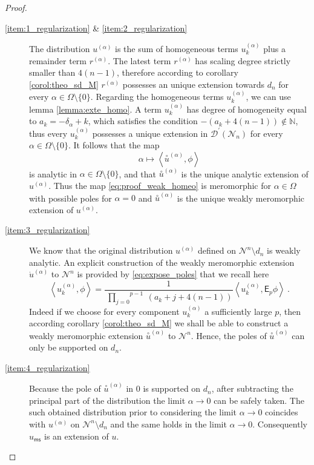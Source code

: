 \documentclass[11pt]{book}
\newcommand{\ms}{\mathsf{ms}}
\newcommand{\sm}[1]{\left\langle#1\right\rangle}
\newcommand{\exte}[1]{\overset{\circ}{#1}}
\newcommand{\Dcal}{\mathcal{D}}
\newcommand{\Ncal}{\mathcal{N}}
\newcommand{\Nbb}{\mathbb{N}}
\newcommand{\Esf}{\mathsf{E}}
\theoremstyle{break}
\begin{document}
\begin{proof}
\begin{description}
%
%
\item[\ref{item:1_regularization} \& \ref{item:2_regularization}] The distribution $u^{(\alpha)}$ is the sum of homogeneous terms $u^{(\alpha)}_k$ plus a remainder term $r^{(\alpha)}$. The latest term $r^{(\alpha)}$ has scaling degree strictly smaller than $4(n-1)$, therefore according to corollary \ref{corol:theo_sd_M} $r^{(\alpha)}$ possesses an unique extension towards $d_n$ for every $\alpha \in \Omega \setminus \{0\}$. Regarding the homogeneous terms $u^{(\alpha)}_k$, we can use lemma \ref{lemma:exte_homo}. A term $u^{(\alpha)}_k$ has degree of homogeneity equal to $a_k = -\delta_\alpha + k$, which satisfies the condition $-\left(a_k+4(n-1)\right) \notin \Nbb$, thus every $u^{(\alpha)}_k$ possesses a unique extension in $\Dcal^\prime(\Ncal_n)$ for every $\alpha \in \Omega \setminus \{0\}$. It follows that the map
%
\begin{equation}
\alpha \mapsto \sm{\exte{u}^{(\alpha)} , \phi} 
\label{eq:proof_weak_homeo}
\end{equation}
%
is analytic in $\alpha \in \Omega \setminus \{0\}$, and that $\exte{u}^{(\alpha)}$ is the unique analytic extension of $u^{(\alpha)}$. Thus the map \eqref{eq:proof_weak_homeo} is meromorphic for $\alpha \in \Omega$ with possible poles for $\alpha=0$ and $\exte{u}^{(\alpha)}$ is the unique weakly meromorphic extension of $u^{(\alpha)}$.%
%
%
\item[\ref{item:3_regularization}] We know that the original distribution $u^{(\alpha)}$ defined on $\Ncal^n\setminus d_n$ is weakly analytic. An explicit construction of the weakly meromorphic extension $\dot{u}^{(\alpha)}$ to $\Ncal^n$ is provided by 
\eqref{eq:expose_poles} that we recall here%
%
\begin{equation*}%
\sm{ u^{(\alpha)}_k, \phi } = \frac{1}{\overset{p-1}{\ \underset{j=0}{\prod}} \ (a_k+j+4(n-1))}   \sm{ u^{(\alpha)}_k, \Esf_p \phi } \ .%
\end{equation*}%
%
Indeed if we choose for every component $u^{(\alpha)}_k$ a sufficiently large $p$, then according corollary \ref{corol:theo_sd_M} we shall be able to construct a weakly meromorphic extension $\exte{u}^{(\alpha)}$ to $\Ncal^n$. Hence, the poles of $\exte{u}^{(\alpha)}$ can only be supported on $d_n$.%
%
%
\item[\ref{item:4_regularization}] Because the pole of $\exte{u}^{(\alpha)}$ in $0$ is supported on $d_n$, after subtracting the principal part of the distribution the limit $\alpha \to 0$ can be safely taken. The such obtained distribution prior to considering the limit $\alpha \to 0$ coincides with $u^{(\alpha)}$ on $\Ncal^n\setminus d_n$ and the same holds in the limit $\alpha\to 0$. Consequently $u_\ms$ is an extension of $u$.\par%

\end{description}
\end{proof}
\end{document}
